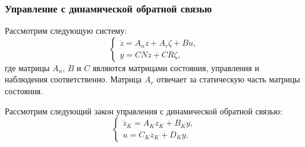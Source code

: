 \begin{frame}
	\frametitle{Управление с динамической обратной связью}
	Рассмотрим следующую систему:
	\begin{equation}
		\label{eq:part5_linear_dynamics}
		\begin{cases}
			\dot z={A}_n {z} + {A}_r {\zeta} + {B} {u},\\
			y = {C} {N} {z} + {C} {R} {\zeta},
		\end{cases}
	\end{equation}
	где матрицы $A_n$,  $B$ и $C$ являются матрицами состояния, управления и наблюдения соответственно. Матрица ${A}_r$ отвечает за статическую часть матрицы состояния.
	
	Рассмотрим следующий закон управления с динамической обратной связью:
	\begin{equation}
		\label{eq:part5_controller}
		\begin{cases}
			\dot{{z}}_K = {A}_K {z}_K + {B}_K {y},\\
			{u} = {C}_K {z}_K + {D}_K {y}.
		\end{cases}
	\end{equation}
\end{frame}

